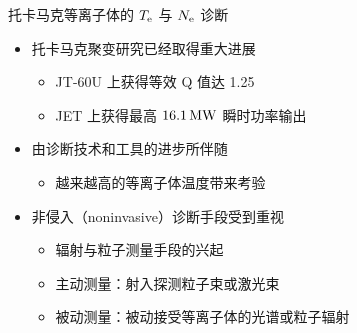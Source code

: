 \begin{CJK*}{UTF8}{kai}
\begin{frame}{托卡马克等离子体的 $T_{\rm e}$ 与 $N_{\rm e}$ 诊断}
    \begin{itemize}
      \item 托卡马克聚变研究已经取得重大进展
        \begin{itemize}
          \item JT-60U 上获得等效 Q 值达 1.25 
          \item JET 上获得最高 $16.1\,{\rm MW}$ 瞬时功率输出 
        \end{itemize}
      \bigskip
      \item 由诊断技术和工具的进步所伴随
        \begin{itemize}
          \item 越来越高的等离子体温度带来考验
        \end{itemize}
      \bigskip
      \item 非侵入（noninvasive）诊断手段受到重视
        \begin{itemize}
          \item 辐射与粒子测量手段的兴起
          \item 主动测量：射入探测粒子束或激光束
          \item 被动测量：被动接受等离子体的光谱或粒子辐射
        \end{itemize}
    \end{itemize}
%    	
%    	
%    	
\end{frame}


\end{CJK*}
